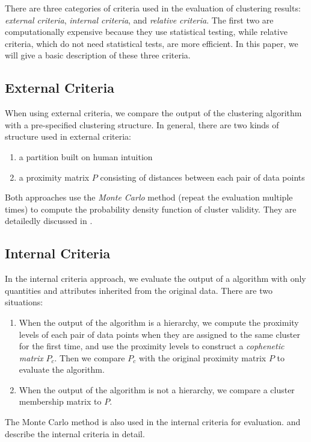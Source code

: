 \documentclass[conference]{IEEEtran}
\begin{document}
There are three categories of criteria used in the evaluation of clustering results: \textit{external criteria}, \textit{internal criteria}, and \textit{relative criteria}. The first two are computationally expensive because they use statistical testing, while relative criteria, which do not need statistical tests, are more efficient. In this paper, we will give a basic description of these three criteria.

\subsection{External Criteria}
When using external criteria, we compare the output of the clustering algorithm with a pre-specified clustering structure. In general, there are two kinds of structure used in external criteria:

\begin{enumerate}
\item a partition built on human intuition
\item a proximity matrix $P$ consisting of distances between each pair of data points
\end{enumerate}

Both approaches use the \textit{Monte Carlo} method (repeat the evaluation multiple times) to compute the probability density function of cluster validity. They are detailedly discussed in \cite{Halkidi:2002:CVM:565117.565124}.

\subsection{Internal Criteria}
In the internal criteria approach, we evaluate the output of a algorithm with only quantities and attributes inherited from the original data. There are two situations:

\begin{enumerate}
\item When the output of the algorithm is a hierarchy, we compute the proximity levels of each pair of data points when they are assigned to the same cluster for the first time, and use the proximity levels to construct a \textit{cophenetic matrix} $P_c$. Then we compare $P_c$ with the original proximity matrix $P$ to evaluate the algorithm.
\item When the output of the algorithm is not a hierarchy, we compare a cluster membership matrix to $P$.
\end{enumerate}

The Monte Carlo method is also used in the internal criteria for evaluation. \cite{Halkidi:2002:CVM:565117.565124} and \cite{milligan1981monte} describe the internal criteria in detail.
\end{document}
